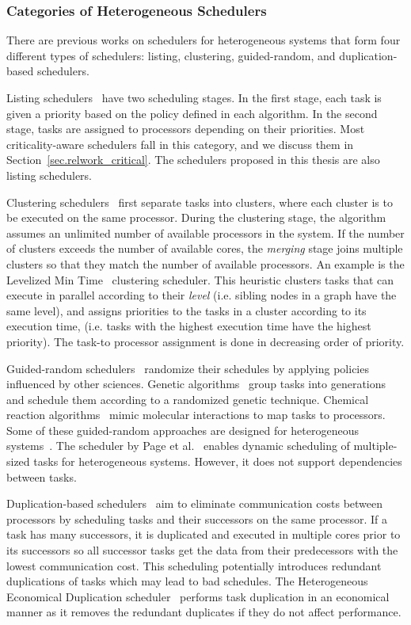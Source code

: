 \subsubsection{Categories of Heterogeneous Schedulers}

There are previous works on schedulers for heterogeneous systems that form four different types of schedulers: listing, clustering, guided-random, and duplication-based schedulers.

Listing schedulers~\cite{List, DCPS, LDCP, HEFT, CrPathDup} have two scheduling stages. In the first stage, each task is given a priority based on the policy defined in each algorithm. In the second stage, tasks are assigned to processors depending on their priorities. Most criticality-aware schedulers fall in this category, and we discuss them in Section~\ref{sec.relwork_critical}. The schedulers proposed in this thesis are also  listing schedulers.

Clustering schedulers~\cite{Hypertool, DSC, DCPS, Hetero95} first separate tasks into clusters, where each cluster is to be executed on the same processor. During the clustering stage, the algorithm assumes an unlimited number of available processors in the system. If the number of clusters exceeds the number of available cores, the \textit{merging} stage joins multiple clusters so that they match the number of available processors. An example is the Levelized Min Time~\cite{Hetero95} clustering scheduler. This heuristic clusters tasks that can execute in parallel according to their \textit{level} (i.e. sibling nodes in a graph have the same level), and assigns priorities to the tasks in a cluster according to its execution time, (i.e. tasks with the highest execution time have the highest priority). The task-to processor assignment is done in decreasing order of priority.

Guided-random schedulers~\cite{Gen07, Chemical, Dyn05} randomize their schedules by applying policies influenced by other sciences. Genetic algorithms~\cite{Gen07} group tasks into generations and schedule them according to a randomized genetic technique. Chemical reaction algorithms~\cite{Chemical} mimic molecular interactions to map tasks to processors. Some of these guided-random approaches are designed for heterogeneous systems~\cite{Gen07, Chemical}. The scheduler by Page et al.~\cite{Dyn05} enables dynamic scheduling of multiple-sized tasks for heterogeneous systems. However, it does not support dependencies between tasks.

Duplication-based schedulers~\cite{Dup03, Dup11, Dup09} aim to eliminate communication costs between processors by scheduling tasks and their successors on the same processor. If a task has many successors, it is duplicated and executed in multiple cores prior to its successors so all successor tasks get the data from their predecessors with the lowest communication cost. This scheduling potentially introduces redundant duplications of tasks which may lead to bad schedules. The Heterogeneous Economical Duplication scheduler~\cite{Dup09} performs task duplication in an economical manner as it removes the redundant duplicates if they do not affect performance. 

